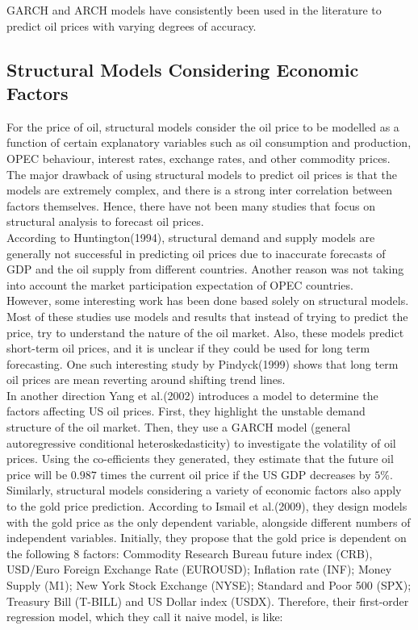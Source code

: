 \documentclass[runningheads]{llncs}
\begin{document}
\noindent GARCH and ARCH models have consistently been used in the literature to predict oil prices with varying degrees of accuracy. 

\subsection{Structural Models Considering Economic Factors}

For the price of oil, structural models consider the oil price to be modelled as a function of certain explanatory variables such as oil consumption and production, OPEC behaviour, interest rates, exchange rates, and other commodity prices. The major drawback of using structural models to predict oil prices is that the models are extremely complex, and there is a strong inter correlation between factors themselves. Hence, there have not been many studies that focus on structural analysis to forecast oil prices.\\

\noindent According to Huntington(1994)\cite{huntington}, structural demand and supply models are generally not successful in predicting oil prices due to inaccurate forecasts of GDP and the oil supply from different countries. Another reason was not taking into account the market participation expectation of OPEC countries. \\

\noindent However, some interesting work has been done based solely on structural models. Most of these studies use models and results that instead of trying to predict the price, try to understand the nature of the oil market. Also, these models predict short-term oil prices, and it is unclear if they could be used for long term forecasting. One such interesting study by Pindyck(1999)\cite{pindyck} shows that long term oil prices are mean reverting around shifting trend lines. \\

\noindent In another direction Yang et al.(2002) \cite{yang} introduces a model to determine the factors affecting US oil prices. First, they highlight the unstable demand structure of the oil market. Then, they use a GARCH model (general autoregressive conditional heteroskedasticity) to investigate the volatility of oil prices. Using the co-efficients they generated, they estimate that the future oil price will be $0.987$ times the current oil price if the US GDP decreases by $5\%$. \\

\noindent Similarly, structural models considering a variety of economic factors also apply to the gold price prediction. According to Ismail et al.(2009)\cite{gold-Ismail}, they design models with the gold price as the only dependent variable, alongside different numbers of independent variables. Initially, they propose that the gold price is dependent on the following 8 factors: Commodity Research Bureau future index (CRB), USD/Euro Foreign Exchange Rate (EUROUSD); Inflation rate (INF); Money Supply (M1); New York Stock Exchange (NYSE); Standard and Poor 500 (SPX); Treasury Bill (T-BILL) and US Dollar index (USDX). Therefore, their first-order regression model, which they call it naive model, is like: \\
\end{document}
